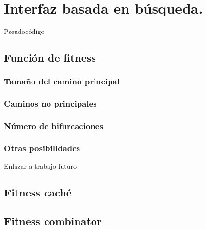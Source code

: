 \chapter{Interfaz basada en búsqueda.}\label{cap:capitulo5}

Pseudocódigo

\section{Función de fitness}


\subsection{Tamaño del camino principal}

\subsection{Caminos no principales}

\subsection{Número de bifurcaciones}

\subsection{Otras posibilidades}

Enlazar a trabajo futuro

\section{Fitness caché}

\section{Fitness combinator}



